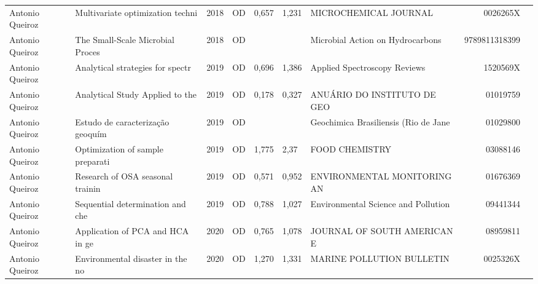\documentclass[12pt,brazil]{article}\usepackage[]{graphicx}\usepackage[]{xcolor}
\begin{document}
\begin{longtable}{lllrrllrr}
\rowcolor{duplic}\rowcolor{duplic}\rowcolor{duplic}\rowcolor{duplic}\rowcolor{duplic}\rowcolor{duplic}\rowcolor{duplic}\rowcolor{duplic}\rowcolor{duplic}\rowcolor{duplic}\rowcolor{duplic}\rowcolor{duplic}\rowcolor{duplic}\rowcolor{duplic}\rowcolor{duplic}\rowcolor{duplic}Antonio Queiroz & Multivariate optimization techni & 2018 & OD & 0,657 & 1,231 & MICROCHEMICAL JOURNAL & 0026265X \\
\rowcolor{coautr}\rowcolor{coautr}\rowcolor{coautr}\rowcolor{coautr}\rowcolor{coautr}\rowcolor{coautr}\rowcolor{coautr}\rowcolor{coautr}\rowcolor{coautr}\rowcolor{coautr}\rowcolor{coautr}\rowcolor{coautr}\rowcolor{coautr}\rowcolor{coautr}\rowcolor{coautr}\rowcolor{coautr}Antonio Queiroz & The Small-Scale Microbial Proces & 2018 & OD &  &  & Microbial Action on Hydrocarbons & 9789811318399 \\
Antonio Queiroz & Analytical strategies for spectr & 2019 & OD & 0,696 & 1,386 & Applied Spectroscopy Reviews & 1520569X \\
Antonio Queiroz & Analytical Study Applied to the  & 2019 & OD & 0,178 & 0,327 & ANUÁRIO DO INSTITUTO DE GEO & 01019759 \\
Antonio Queiroz & Estudo de caracterização geoquím & 2019 & OD &  &  & Geochimica Brasiliensis (Rio de Jane & 01029800 \\
Antonio Queiroz & Optimization of sample preparati & 2019 & OD & 1,775 & 2,37 & FOOD CHEMISTRY & 03088146 \\
Antonio Queiroz & Research of OSA seasonal trainin & 2019 & OD & 0,571 & 0,952 & ENVIRONMENTAL MONITORING AN & 01676369 \\
Antonio Queiroz & Sequential determination and che & 2019 & OD & 0,788 & 1,027 & Environmental Science and Pollution  & 09441344 \\
\rowcolor{coautr}\rowcolor{coautr}\rowcolor{coautr}\rowcolor{coautr}\rowcolor{coautr}\rowcolor{coautr}\rowcolor{coautr}\rowcolor{coautr}\rowcolor{coautr}\rowcolor{coautr}\rowcolor{coautr}\rowcolor{coautr}\rowcolor{coautr}\rowcolor{coautr}\rowcolor{coautr}\rowcolor{coautr}Antonio Queiroz & Application of PCA and HCA in ge & 2020 & OD & 0,765 & 1,078 & JOURNAL OF SOUTH AMERICAN E & 08959811 \\
\rowcolor{coautr}\rowcolor{coautr}\rowcolor{coautr}\rowcolor{coautr}\rowcolor{coautr}\rowcolor{coautr}\rowcolor{coautr}\rowcolor{coautr}\rowcolor{coautr}\rowcolor{coautr}\rowcolor{coautr}\rowcolor{coautr}\rowcolor{coautr}\rowcolor{coautr}\rowcolor{coautr}\rowcolor{coautr}Antonio Queiroz & Environmental disaster in the no & 2020 & OD & 1,270 & 1,331 & MARINE POLLUTION BULLETIN & 0025326X \\

\end{longtable}
\end{document}
